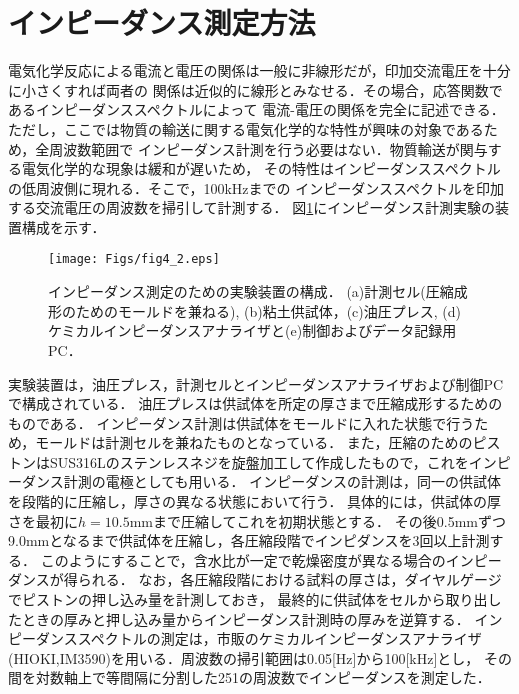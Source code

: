 \section{インピーダンス測定方法}
電気化学反応による電流と電圧の関係は一般に非線形だが，印加交流電圧を十分に小さくすれば両者の
関係は近似的に線形とみなせる．その場合，応答関数であるインピーダンススペクトルによって
電流-電圧の関係を完全に記述できる．
ただし，ここでは物質の輸送に関する電気化学的な特性が興味の対象であるため，全周波数範囲で
インピーダンス計測を行う必要はない．物質輸送が関与する電気化学的な現象は緩和が遅いため，
その特性はインピーダンススペクトルの低周波側に現れる．そこで，100kHzまでの
インピーダンススペクトルを印加する交流電圧の周波数を掃引して計測する．
図\ref{fig:fig4_2}にインピーダンス計測実験の装置構成を示す．
\begin{figure}[h]
	\begin{center}
	\texttt{[image: Figs/fig4\_2.eps]} 
	\end{center}
	\caption{
		インピーダンス測定のための実験装置の構成．
		(a)計測セル(圧縮成形のためのモールドを兼ねる), (b)粘土供試体，(c)油圧プレス, 
		(d)ケミカルインピーダンスアナライザと(e)制御およびデータ記録用PC．
	} 
	\label{fig:fig4_2}
\end{figure}
実験装置は，油圧プレス，計測セルとインピーダンスアナライザおよび制御PCで構成されている．
油圧プレスは供試体を所定の厚さまで圧縮成形するためのものである．
インピーダンス計測は供試体をモールドに入れた状態で行うため，モールドは計測セルを兼ねたものとなっている．
また，圧縮のためのピストンはSUS316Lのステンレスネジを旋盤加工して作成したもので，これをインピーダンス計測の電極としても用いる．
インピーダンスの計測は，同一の供試体を段階的に圧縮し，厚さの異なる状態において行う．
具体的には，供試体の厚さを最初に$h=10.5$mmまで圧縮してこれを初期状態とする．
その後0.5mmずつ9.0mmとなるまで供試体を圧縮し，各圧縮段階でインピダンスを3回以上計測する．
このようにすることで，含水比が一定で乾燥密度が異なる場合のインピーダンスが得られる．
なお，各圧縮段階における試料の厚さは，ダイヤルゲージでピストンの押し込み量を計測しておき，
最終的に供試体をセルから取り出したときの厚みと押し込み量からインピーダンス計測時の厚みを逆算する．
インピーダンススペクトルの測定は，市販のケミカルインピーダンスアナライザ
(HIOKI,IM3590)を用いる．周波数の掃引範囲は0.05[Hz]から100[kHz]とし，
その間を対数軸上で等間隔に分割した251の周波数でインピーダンスを測定した．
